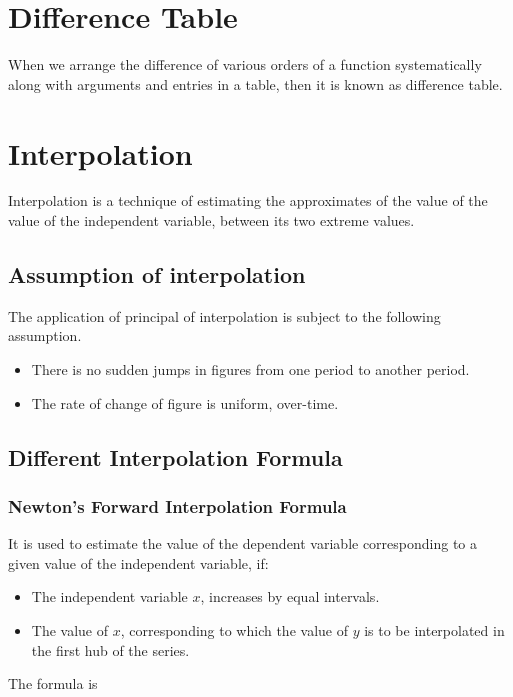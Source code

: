 \documentclass[10pt, twoside, a4paper]{article}
\begin{document}
\section{Difference Table}%
When we arrange the difference of various orders of a function systematically 
along with arguments and entries in a table, then it is known as difference 
table.

\section{Interpolation}%
Interpolation is a technique of estimating the approximates of the value of
the value of the independent variable, between its two extreme values.

\subsection{Assumption of interpolation}
The application of principal of interpolation is subject to the following
assumption.

\begin{itemize}
  \item There is no sudden jumps in figures from one period to another period.
  \item The rate of change of figure is uniform, over-time.
\end{itemize}

\subsection{Different Interpolation Formula}%
\subsubsection{Newton's Forward Interpolation Formula}%
It is used to estimate the value of the dependent variable corresponding to a 
given value of the independent variable, if:

\begin{itemize}
  \item The independent variable $x$, increases by equal intervals.
  \item The value of $x$, corresponding to which the value of $y$ is to be 
    interpolated in the first hub of the series.
\end{itemize}
The formula is
\end{document}
